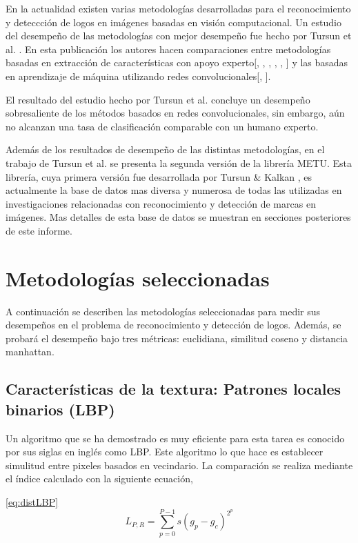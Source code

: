 \documentclass[conference]{IEEEtran}
\begin{document}
En la actualidad existen varias metodologías desarrolladas para el reconocimiento y deteccción de logos en imágenes basadas en visión computacional. Un estudio del desempeño de las metodologías con mejor desempeño fue hecho por Tursun et al. \cite{metuV2}. En esta publicación los autores hacen comparaciones entre metodologías basadas en extracción de características con apoyo experto[\cite{bowd}, \cite{colorHist}, \cite{GIST}, \cite{kpoint}, \cite{LBP}, \cite{shape}] y las basadas en aprendizaje de máquina utilizando redes convolucionales[\cite{cnn1}, \cite{cnn2}]. 

El resultado del estudio hecho por Tursun et al. \cite{metuV2} concluye un desempeño sobresaliente de los métodos basados en redes convolucionales, sin embargo, aún no alcanzan una tasa de clasificación comparable con un humano experto. 

Además de los resultados de desempeño de las distintas metodologías, en el trabajo de Tursun et al. \cite{metuV2} se presenta la segunda versión de la librería METU. Esta librería, cuya primera versión fue desarrollada por Tursun \& Kalkan \cite{metuV1}, es actualmente la base de datos mas diversa y numerosa de todas las utilizadas en investigaciones relacionadas con reconocimiento y detección de marcas en imágenes. Mas detalles de esta base de datos se muestran en secciones posteriores de este informe. 


\section{Metodologías seleccionadas}
A continuación se describen las metodologías seleccionadas para medir sus desempeños en el problema de reconocimiento y detección de logos. Además, se probará el desempeño bajo tres métricas: euclidiana, similitud coseno y distancia manhattan.

\subsection{Caracter\'isticas de la textura: Patrones locales binarios (LBP)}

Un algoritmo que se ha demostrado es muy eficiente para esta tarea es conocido por sus siglas en inglés como LBP\cite{LBP}. Este algoritmo lo que hace es establecer simulitud entre pixeles basados en vecindario. La comparación se realiza mediante el índice calculado con la siguiente ecuación,

\ref{eq:distLBP} 
	\begin{equation}
	L_{P,R} = \sum_{p=0}^{P-1} s{(g_p - g_c)}^{{2}^p}
	\label{eq:distLBP}
\end{equation}
\end{document}
